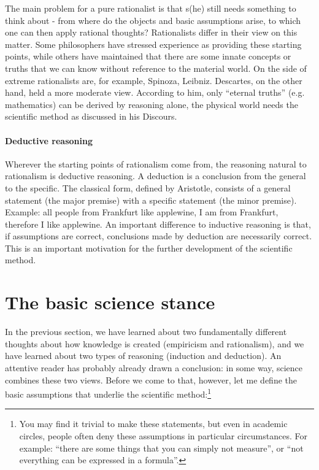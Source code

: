 \documentclass{tufte-book}
\begin{document}
The main problem for a pure rationalist is that s(he) still needs something to think  about - from where do the objects and basic assumptions arise, to which one can then apply rational thoughts? Rationalists differ in their view on this matter. Some philosophers have stressed experience as providing these starting points, while others have maintained that there are some innate concepts or truths that we can know without reference to the material world. On the side of extreme rationalists are, for example, Spinoza, Leibniz. Descartes, on the other hand, held a more moderate view. According to him, only ``eternal truths'' (e.g. mathematics) can be derived by reasoning alone, the physical world needs the scientific method as discussed in his Discours. 

\paragraph{Deductive reasoning}Wherever the starting points of rationalism come from, the reasoning natural to rationalism is deductive reasoning. A deduction is a conclusion from the general to the specific. The classical form, defined by Aristotle, consists of a general statement (the major premise) with a specific statement (the minor premise). Example: all people from Frankfurt like applewine, I am from Frankfurt, therefore I like applewine. An important difference to inductive reasoning is that, if assumptions are correct, conclusions made by deduction are necessarily correct. This is an important motivation for the further development of the scientific method.


\section{The basic science stance}

In the previous section, we have learned about two fundamentally different thoughts about how knowledge is created (empiricism and rationalism), and we have learned about two types of reasoning (induction and deduction). An attentive reader has probably already drawn a conclusion: in some way, science combines these two views. Before we come to that, however, let me define the basic assumptions that underlie the scientific method:\footnote{You may find it trivial to make these statements, but even in academic circles, people often deny these assumptions in particular circumstances. For example: ``there are some things that you can simply not measure'', or ``not everything can be expressed in a formula''.}
\end{document}
